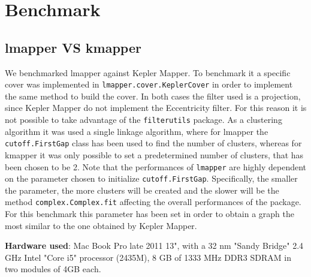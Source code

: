 \section{Benchmark}

\subsection{lmapper VS kmapper}
We benchmarked lmapper against Kepler Mapper. To benchmark it a specific cover was implemented in \lstinline|lmapper.cover.KeplerCover| in order to implement the same method to build the cover. In both cases the filter used is a projection, since Kepler Mapper do not implement the Eccentricity filter. For this reason it is not possible to take advantage of the \lstinline|filterutils| package. As a clustering algorithm it was used a single linkage algorithm, where for lmapper the \lstinline|cutoff.FirstGap| class has been used to find the number of clusters, whereas for kmapper it was only possible to set a predetermined number of clusters, that has been chosen to be 2. Note that the performances of \lstinline|lmapper| are highly dependent on the parameter chosen to initialize \lstinline|cutoff.FirstGap|. Specifically, the smaller the parameter, the more clusters will be created and the slower will be the method \lstinline|complex.Complex.fit| affecting the overall performances of the package. For this benchmark this parameter has been set in order to obtain a graph the most similar to the one obtained by Kepler Mapper.

\textbf{Hardware used}:
Mac Book Pro late 2011 13", with a 32 nm "Sandy Bridge" 2.4 GHz Intel "Core i5" processor (2435M), 8 GB of 1333 MHz DDR3 SDRAM in two modules of 4GB each.

